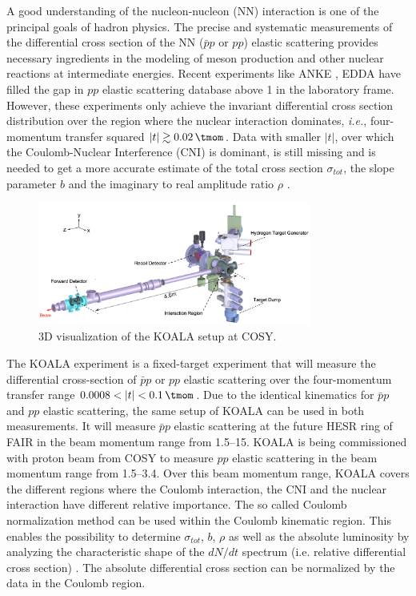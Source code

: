\documentclass[number,5p]{elsarticle}
\begin{document}
A good understanding of the nucleon-nucleon (NN) interaction is one of the principal goals of hadron physics.
The precise and systematic measurements of the differential cross section of the
NN ($\bar{p}p$ or $pp$) elastic scattering provides necessary ingredients
in the modeling of meson production and other nuclear reactions at intermediate energies.
Recent experiments like ANKE \cite{ANKE}, EDDA \cite{EDDA} have filled the gap
in $pp$ elastic scattering database above \SI{1}{\momentum} in the laboratory frame.
However, these experiments only achieve the invariant differential cross section distribution over the region where the nuclear interaction dominates, 
\textit{i.e.}, four-momentum transfer squared $|t| \gtrsim \SI{0.02}{\tmom}$.
Data with smaller \(|t|\), over which the Coulomb-Nuclear Interference (CNI) is
dominant, is still missing and is needed to get a more accurate estimate of
the total cross section \({\sigma}_{tot}\), the slope parameter \(b\) and the
imaginary to real amplitude ratio \(\rho\) \cite{RevModPhys.57.563}.

\begin{figure}[htbp]
	\centering
	\includegraphics[width=0.8\textwidth]{./koala_setup.png}
	\caption{3D visualization of the KOALA setup at COSY.}
	\label{fig:setup}
\end{figure}

The KOALA experiment is a fixed-target experiment that will measure the
differential cross-section of $\bar{p}p$ or $pp$ elastic scattering
over the four-momentum transfer range $0.0008 < |t| < \SI{0.1}{\tmom}$.
Due to the identical kinematics for $\bar{p}p$ and $pp$ elastic scattering, the
same setup of KOALA can be used in both measurements.
It will measure $\bar{p}p$ elastic
scattering at the future HESR ring of FAIR \cite{FAIR} in the beam momentum range from
\SIrange{1.5}{15}{\momentum}.
KOALA is being commissioned with proton beam from COSY \cite{COSY} to measure $pp$ elastic scattering in the beam momentum range from \SIrange{1.5}{3.4}{\momentum}.
Over this beam momentum range, KOALA covers the different regions where the
Coulomb interaction, the CNI and the nuclear interaction have different relative importance.
The so called Coulomb normalization method \cite{bernard1987real,jenni2008atlas}
can be used within the Coulomb kinematic region.
This enables the possibility to determine \({\sigma}_{tot}\), \(b\), \(\rho\) as well as
the absolute luminosity by analyzing the characteristic shape of the $dN/dt$
spectrum (i.e. relative differential cross section) \cite{koala_article}.
The absolute differential cross section can be normalized by the data in the
Coulomb region.
\end{document}
